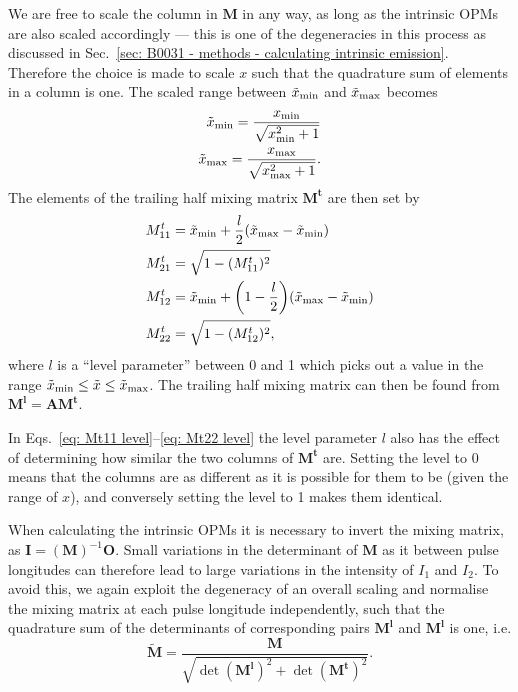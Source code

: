 We are free to scale the column in $\mathbf{M}$ in any way, as long as the intrinsic OPMs are also scaled accordingly --- this is one of the degeneracies in this process as discussed in Sec.~\ref{sec: B0031 - methods - calculating intrinsic emission}. Therefore the choice is made to scale $x$ such that the quadrature sum of elements in a column is one. The scaled range between $\Tilde{x}_\mathrm{min}$ and $\Tilde{x}_\mathrm{max}$ becomes
\begin{align}
    \Tilde{x}_\mathrm{min} = \frac{x_\mathrm{min}}{\sqrt{x_\mathrm{min}^2 + 1}}\\
    \Tilde{x}_\mathrm{max} = \frac{x_\mathrm{max}}{\sqrt{x_\mathrm{max}^2 + 1}}. 
\end{align}
The elements of the trailing half mixing matrix $\mathbf{M^t}$ are then set by
\begin{align}
    M_{11}^t &= \Tilde{x}_\mathrm{min} + \frac{l}{2}(\Tilde{x}_\mathrm{max} - \Tilde{x}_\mathrm{min})\label{eq: Mt11 level}\\
    M_{21}^t &= \sqrt{1-(M_{11}^t)^2}\label{eq: Mt12 level}\\
    M_{12}^t &= \Tilde{x}_\mathrm{min} + \bigg(1-\frac{l}{2}\bigg)(\Tilde{x}_\mathrm{max} - \Tilde{x}_\mathrm{min})\label{eq: Mt21 level}\\
    M_{22}^t &= \sqrt{1-(M_{12}^t)^2}\label{eq: Mt22 level},
\end{align}
where $l$ is a ``level parameter'' between 0 and 1 which picks out a value in the range $\Tilde{x}_\mathrm{min} \leq \tilde{x} \leq \Tilde{x}_\mathrm{max}$. The trailing half mixing matrix can then be found from $\mathbf{M^l}=\mathbf{AM^t}$.

In Eqs.~\eqref{eq: Mt11 level}--\eqref{eq: Mt22 level} the level parameter $l$ also has the effect of determining how similar the two columns of $\mathbf{M^t}$ are. Setting the level to 0 means that the columns are as different as it is possible for them to be (given the range of $x$), and conversely setting the level to 1 makes them identical.


When calculating the intrinsic OPMs it is necessary to invert the mixing matrix, as $\mathbf{I}=(\mathbf{M})^{-1}\mathbf{O}$. Small variations in the determinant of $\mathbf{M}$ as it between pulse longitudes can therefore lead to large variations in the intensity of $I_1$ and $I_2$. To avoid this, we again exploit the degeneracy of an overall scaling and normalise the mixing matrix at each pulse longitude independently, such that the quadrature sum of the determinants of corresponding pairs $\mathbf{M^l}$ and $\mathbf{M^l}$  is one, i.e.
\begin{equation}
    \widetilde{\mathbf{M}} = \frac{\mathbf{M}}{\sqrt{\det(\mathbf{M^l})^2 + \det(\mathbf{M^t})^2}}.
\end{equation}





